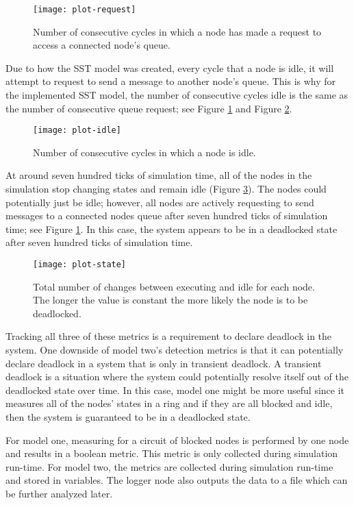 \documentclass{article}
\newcommand{\plotsize}{0.23}
\begin{document}
\begin{figure}[H]
	\texttt{[image: plot-request]}
	\centering
	\caption{Number of consecutive cycles in which a node has made a request to access a connected node's queue.}
	\label{fig:request}
	\centering
\end{figure}

Due to how the SST model was created, every cycle that a node is idle, it will attempt to request to send a message to another node's queue. This is why for the implemented SST model, the number of consecutive cycles idle is the same as the number of consecutive queue request; see Figure \ref{fig:request} and Figure \ref{fig:idle}.

\begin{figure}[H]
	\texttt{[image: plot-idle]}
	\centering
	\caption{Number of consecutive cycles in which a node is idle.}
	\label{fig:idle}
	\centering
\end{figure}

At around seven hundred ticks of simulation time, all of the nodes in the simulation stop changing states and remain idle (Figure \ref{fig:state}). The nodes could potentially just be idle; however, all nodes are actively requesting to send messages to a connected nodes queue after seven hundred ticks of simulation time; see Figure \ref{fig:request}. In this case, the system appears to be in a deadlocked state after seven hundred ticks of simulation time.

\begin{figure}[H]
	\texttt{[image: plot-state]}
	\centering
	\caption{Total number of changes between executing and idle for each node. The longer the value is constant the more likely the node is to be deadlocked.}
	\label{fig:state}
	\centering
\end{figure}

Tracking all three of these metrics is a requirement to declare deadlock in the system. One downside of model two's detection metrics is that it can potentially declare deadlock in a system that is only in transient deadlock. A transient deadlock is a situation where the system could potentially resolve itself out of the deadlocked state over time. In this case, model one might be more useful since it measures all of the nodes' states in a ring and if they are all blocked and idle, then the system is guaranteed to be in a deadlocked state.

For model one, measuring for a circuit of blocked nodes is performed by one node and results in a boolean metric. This metric is only collected during simulation run-time. For model two, the metrics are collected during simulation run-time and stored in variables. The logger node also outputs the data to a file which can be further analyzed later.
\end{document}
